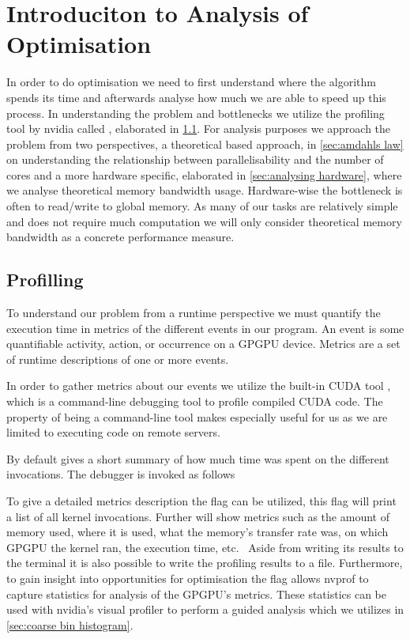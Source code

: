 \section{Introduciton to Analysis of Optimisation}
\label{sec:introduction to analysis of optimisation}

In order to do optimisation we need to first understand where the algorithm spends its time and afterwards analyse how much we are able to speed up this process.
In understanding the problem and bottlenecks we utilize the profiling tool by nvidia called , elaborated in \cref{sec:profiling}.
For analysis purposes we approach the problem from two perspectives, a theoretical based approach, in \cref{sec:amdahls law} on understanding the relationship between parallelisability and the number of cores and a more hardware specific, elaborated in \cref{sec:analysing hardware}, where we analyse theoretical memory bandwidth usage.
Hardware-wise the bottleneck is often to read/write to global memory.
As many of our tasks are relatively simple and does not require much computation we will only consider theoretical memory bandwidth as a concrete performance measure.

\subsection{Profilling}
\label{sec:profiling}
To understand our problem from a runtime perspective we must quantify the execution time in metrics of the different events in our program.
An event is some quantifiable activity, action, or occurrence on a GPGPU device.
Metrics are a set of runtime descriptions of one or more events.

In order to gather metrics about our events we utilize the built-in CUDA tool , which is a command-line debugging tool to profile compiled CUDA code.
The property of being a command-line tool makes  especially useful for us as we are limited to executing code on remote servers.

By default  gives a short summary of how much time was spent on the different invocations.
The debugger is invoked as follows
%
\begin{quote}
\end{quote}
%
To give a detailed metrics description the flag  can be utilized, this flag will print a list of all kernel invocations.
Further  will show metrics such as the amount of memory used, where it is used, what the memory's transfer rate was, on which GPGPU the kernel ran, the execution time, etc.~\cite{profiling2015doc}
Aside from writing its results to the terminal it is also possible to write the profiling results to a file.
Furthermore, to gain insight into opportunities for optimisation the  flag allows nvprof to capture statistics for analysis of the GPGPU's metrics.
These statistics can be used with nvidia's visual profiler to perform a guided analysis which we utilizes in \cref{sec:coarse bin histogram}.~\cite{nvprof2013tips}

